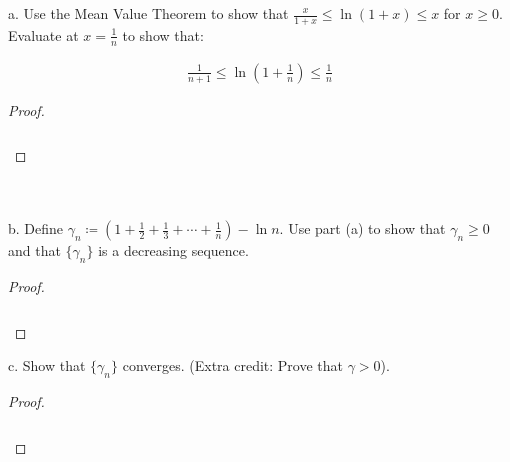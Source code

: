a.  Use the Mean Value Theorem to show that
    $\frac{x}{1 + x} \le \ln{\left(1 + x\right)} \le x$ for $x \ge 0$. Evaluate at
    $x = \frac{1}{n}$ to show that:

    \begin{align*}
        \frac{1}{n+1} \le \ln{\left(1 + \frac{1}{n}\right)} \le \frac{1}{n}
    \end{align*}

    \begin{proof}\ \\\\
    
        \begin{align*}
        \end{align*}
    \end{proof}
    \ \\\\

b.  Define $\gamma_n \coloneqq \left(1 + \frac{1}{2} + \frac{1}{3} + \cdots + \frac{1}{n} \right) - \ln{n}.$
    Use part (a) to show that $\gamma_n \ge 0$ and that $\{\gamma_n\}$ is a
    decreasing sequence.

    \begin{proof}\ \\\\

        \begin{align*}
        \end{align*}

    \end{proof}

c.  Show that $\{\gamma_n\}$ converges. (Extra credit: Prove that $\gamma > 0$).

    \begin{proof}\ \\\\

        \begin{align*}
        \end{align*}

    \end{proof}